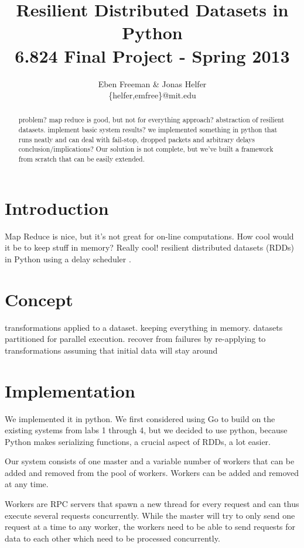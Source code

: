 \documentclass[10pt]{article}
\begin{document}
\title{Resilient Distributed Datasets in Python \\ \small{6.824 Final Project - Spring 2013}}
\author{Eben Freeman \& Jonas Helfer\\
\small{\{helfer,emfree\}@mit.edu}
}
\maketitle

\begin{abstract}
problem?
map reduce is good, but not for everything
approach?
abstraction of resilient datasets. implement basic system
results?
we implemented something in python that runs neatly and can deal with fail-stop, dropped packets and arbitrary delays
conclusion/implications?
Our solution is not complete, but we've built a framework from scratch that can be easily extended.

\end{abstract}
\section*{Introduction}
Map Reduce is nice, but it's not great for on-line computations. How cool would it be to keep stuff in memory? Really cool! resilient distributed datasets (RDDs) \cite{rdd} in Python using a delay scheduler \cite{delay}.


\section*{Concept}
transformations applied to a dataset. keeping everything in memory. datasets partitioned for parallel execution.
recover from failures by re-applying to transformations assuming that initial data will stay around

\section*{Implementation}
We implemented it in python. We first considered using Go to build on the existing systems from labs 1 through 4, but we decided to use python, because Python makes serializing functions, a crucial aspect of RDDs, a lot easier.

Our system consists of one master and a variable number of workers that can be added and removed from the pool of workers. Workers can be added and removed at any time.

Workers are RPC servers that spawn a new thread for every request and can thus execute several requests concurrently. While the master will try to only send one request at a time to any worker, the workers need to be able to send requests for data to each other which need to be processed concurrently.
\end{document}

